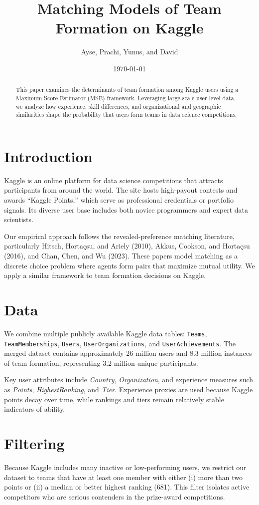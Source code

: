 \documentclass[12pt]{article}
\title{\textbf{Matching Models of Team Formation on Kaggle}}
\author{Ayse, Prachi, Yunus, and David}
\date{\today}
\begin{document}
\maketitle

\begin{abstract}
This paper examines the determinants of team formation among Kaggle users using a Maximum Score Estimator (MSE) framework. Leveraging large-scale user-level data, we analyze how experience, skill differences, and organizational and geographic similarities shape the probability that users form teams in data science competitions. 
\end{abstract}

\section{Introduction}
Kaggle is an online platform for data science competitions that attracts participants from around the world. The site hosts high-payout contests and awards ``Kaggle Points,'' which serve as professional credentials or portfolio signals. Its diverse user base includes both novice programmers and expert data scientists. 

Our empirical approach follows the revealed-preference matching literature, particularly Hitsch, Hortaçsu, and Ariely (2010), Akkus, Cookson, and Hortaçsu (2016), and Chan, Chen, and Wu (2023). These papers model matching as a discrete choice problem where agents form pairs that maximize mutual utility. We apply a similar framework to team formation decisions on Kaggle.

\section{Data}
We combine multiple publicly available Kaggle data tables: \texttt{Teams}, \texttt{TeamMemberships}, \texttt{Users}, \texttt{UserOrganizations}, and \texttt{UserAchievements}. The merged dataset contains approximately 26 million users and 8.3 million instances of team formation, representing 3.2 million unique participants.

Key user attributes include \textit{Country}, \textit{Organization}, and experience measures such as \textit{Points}, \textit{HighestRanking}, and \textit{Tier}. Experience proxies are used because Kaggle points decay over time, while rankings and tiers remain relatively stable indicators of ability.

\section{Filtering}
Because Kaggle includes many inactive or low-performing users, we restrict our dataset to teams that have at least one member with either (i) more than two points or (ii) a median or better highest ranking (681). This filter isolates active competitors who are serious contenders in the prize-award competitions.
\end{document}
